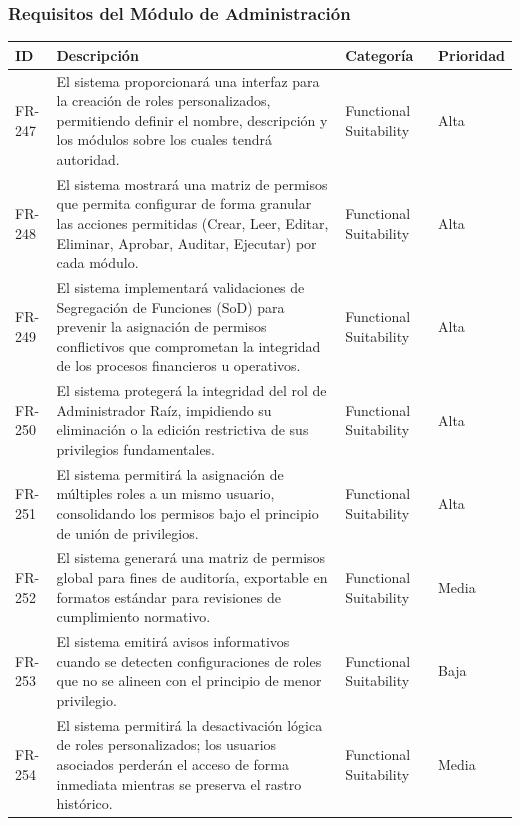 \subsubsection{Requisitos del Módulo de Administración}
\footnotesize
\begin{longtable}{>{\raggedright\arraybackslash}p{} >{\raggedright\arraybackslash}p{} >{\raggedright\arraybackslash}p{} >{\raggedright\arraybackslash}p{}}
\toprule
\rowcolor{gray!15}\textbf{ID} & \textbf{Descripción} & \textbf{Categoría} & \textbf{Prioridad} \\ \midrule
\endhead
FR-247 & El sistema proporcionará una interfaz para la creación de roles personalizados, permitiendo definir el nombre, descripción y los módulos sobre los cuales tendrá autoridad. & Functional Suitability & Alta \\
FR-248 & El sistema mostrará una matriz de permisos que permita configurar de forma granular las acciones permitidas (Crear, Leer, Editar, Eliminar, Aprobar, Auditar, Ejecutar) por cada módulo. & Functional Suitability & Alta \\
FR-249 & El sistema implementará validaciones de Segregación de Funciones (SoD) para prevenir la asignación de permisos conflictivos que comprometan la integridad de los procesos financieros u operativos. & Functional Suitability & Alta \\
FR-250 & El sistema protegerá la integridad del rol de Administrador Raíz, impidiendo su eliminación o la edición restrictiva de sus privilegios fundamentales. & Functional Suitability & Alta \\
FR-251 & El sistema permitirá la asignación de múltiples roles a un mismo usuario, consolidando los permisos bajo el principio de unión de privilegios. & Functional Suitability & Alta \\
FR-252 & El sistema generará una matriz de permisos global para fines de auditoría, exportable en formatos estándar para revisiones de cumplimiento normativo. & Functional Suitability & Media \\
FR-253 & El sistema emitirá avisos informativos cuando se detecten configuraciones de roles que no se alineen con el principio de menor privilegio. & Functional Suitability & Baja \\
FR-254 & El sistema permitirá la desactivación lógica de roles personalizados; los usuarios asociados perderán el acceso de forma inmediata mientras se preserva el rastro histórico. & Functional Suitability & Media \\

\end{longtable}
